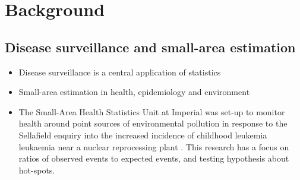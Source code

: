 \documentclass[a4paper, nobind]{templates/ociamthesis}
\providecommand{\tightlist}{%
  \setlength{\itemsep}{0pt}\setlength{\parskip}{0pt}}
\begin{document}
\begin{romanpages}
  \dominitoc %

\flushbottom

\tableofcontents

\listoffigures
	\mtcaddchapter

\listoftables
  \mtcaddchapter




\end{romanpages}

\flushbottom

\hypertarget{background}{%
\chapter{Background}\label{background}}

\adjustmtc
{}

\hypertarget{disease-surveillance-and-small-area-estimation}{%
\section{Disease surveillance and small-area estimation}\label{disease-surveillance-and-small-area-estimation}}

\begin{itemize}
\tightlist
\item
  Disease surveillance is a central application of statistics
\item
  Small-area estimation in health, epidemiology and environment
\item
  The Small-Area Health Statistics Unit at Imperial was set-up to monitor health around point sources of environmental pollution in response to the Sellafield enquiry into the increased incidence of childhood leukemia leukaemia near a nuclear reprocessing plant \autocite{elliott1992small}. This research has a focus on ratios of observed events to expected events, and testing hypothesis about hot-spots.
\end{itemize}
\end{document}

